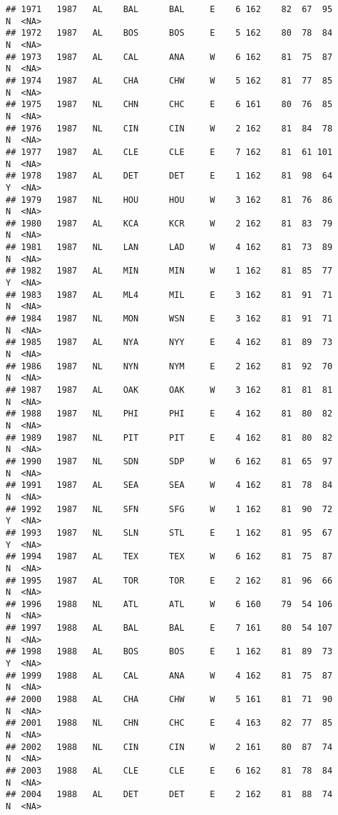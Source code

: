 \documentclass[]{article}
\begin{document}
\begin{verbatim}
## 1971   1987   AL    BAL      BAL     E    6 162    82  67  95      N  <NA>
## 1972   1987   AL    BOS      BOS     E    5 162    80  78  84      N  <NA>
## 1973   1987   AL    CAL      ANA     W    6 162    81  75  87      N  <NA>
## 1974   1987   AL    CHA      CHW     W    5 162    81  77  85      N  <NA>
## 1975   1987   NL    CHN      CHC     E    6 161    80  76  85      N  <NA>
## 1976   1987   NL    CIN      CIN     W    2 162    81  84  78      N  <NA>
## 1977   1987   AL    CLE      CLE     E    7 162    81  61 101      N  <NA>
## 1978   1987   AL    DET      DET     E    1 162    81  98  64      Y  <NA>
## 1979   1987   NL    HOU      HOU     W    3 162    81  76  86      N  <NA>
## 1980   1987   AL    KCA      KCR     W    2 162    81  83  79      N  <NA>
## 1981   1987   NL    LAN      LAD     W    4 162    81  73  89      N  <NA>
## 1982   1987   AL    MIN      MIN     W    1 162    81  85  77      Y  <NA>
## 1983   1987   AL    ML4      MIL     E    3 162    81  91  71      N  <NA>
## 1984   1987   NL    MON      WSN     E    3 162    81  91  71      N  <NA>
## 1985   1987   AL    NYA      NYY     E    4 162    81  89  73      N  <NA>
## 1986   1987   NL    NYN      NYM     E    2 162    81  92  70      N  <NA>
## 1987   1987   AL    OAK      OAK     W    3 162    81  81  81      N  <NA>
## 1988   1987   NL    PHI      PHI     E    4 162    81  80  82      N  <NA>
## 1989   1987   NL    PIT      PIT     E    4 162    81  80  82      N  <NA>
## 1990   1987   NL    SDN      SDP     W    6 162    81  65  97      N  <NA>
## 1991   1987   AL    SEA      SEA     W    4 162    81  78  84      N  <NA>
## 1992   1987   NL    SFN      SFG     W    1 162    81  90  72      Y  <NA>
## 1993   1987   NL    SLN      STL     E    1 162    81  95  67      Y  <NA>
## 1994   1987   AL    TEX      TEX     W    6 162    81  75  87      N  <NA>
## 1995   1987   AL    TOR      TOR     E    2 162    81  96  66      N  <NA>
## 1996   1988   NL    ATL      ATL     W    6 160    79  54 106      N  <NA>
## 1997   1988   AL    BAL      BAL     E    7 161    80  54 107      N  <NA>
## 1998   1988   AL    BOS      BOS     E    1 162    81  89  73      Y  <NA>
## 1999   1988   AL    CAL      ANA     W    4 162    81  75  87      N  <NA>
## 2000   1988   AL    CHA      CHW     W    5 161    81  71  90      N  <NA>
## 2001   1988   NL    CHN      CHC     E    4 163    82  77  85      N  <NA>
## 2002   1988   NL    CIN      CIN     W    2 161    80  87  74      N  <NA>
## 2003   1988   AL    CLE      CLE     E    6 162    81  78  84      N  <NA>
## 2004   1988   AL    DET      DET     E    2 162    81  88  74      N  <NA>

\end{verbatim}
\end{document}
